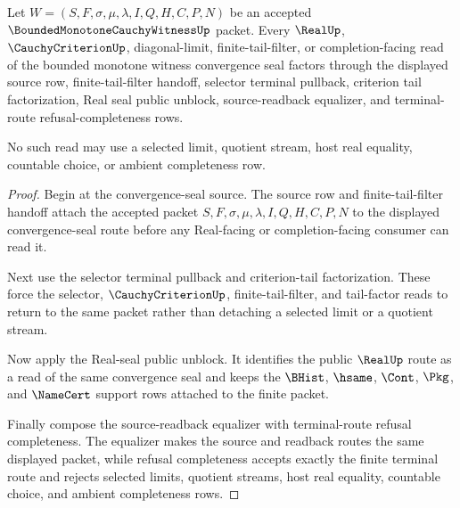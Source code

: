 \begin{theorem}
\label{thm:bounded-monotone-cauchy-witness-convergence-seal-real-exit-exhaustion}
Let $W=(S,F,\sigma,\mu,\lambda,I,Q,H,C,P,N)$ be an accepted $\BoundedMonotoneCauchyWitnessUp$ packet. Every $\RealUp$, $\CauchyCriterionUp$, diagonal-limit, finite-tail-filter, or completion-facing read of the bounded monotone witness convergence seal factors through the displayed source row, finite-tail-filter handoff, selector terminal pullback, criterion tail factorization, Real seal public unblock, source-readback equalizer, and terminal-route refusal-completeness rows.

No such read may use a selected limit, quotient stream, host real equality, countable choice, or ambient completeness row.
\end{theorem}
\begin{proof}
Begin at the convergence-seal source. The source row and finite-tail-filter handoff attach the accepted packet $S,F,\sigma,\mu,\lambda,I,Q,H,C,P,N$ to the displayed convergence-seal route before any Real-facing or completion-facing consumer can read it.

Next use the selector terminal pullback and criterion-tail factorization. These force the selector, $\CauchyCriterionUp$, finite-tail-filter, and tail-factor reads to return to the same packet rather than detaching a selected limit or a quotient stream.

Now apply the Real-seal public unblock. It identifies the public $\RealUp$ route as a read of the same convergence seal and keeps the $\BHist$, $\hsame$, $\Cont$, $\Pkg$, and $\NameCert$ support rows attached to the finite packet.

Finally compose the source-readback equalizer with terminal-route refusal completeness. The equalizer makes the source and readback routes the same displayed packet, while refusal completeness accepts exactly the finite terminal route and rejects selected limits, quotient streams, host real equality, countable choice, and ambient completeness rows.
\end{proof}

